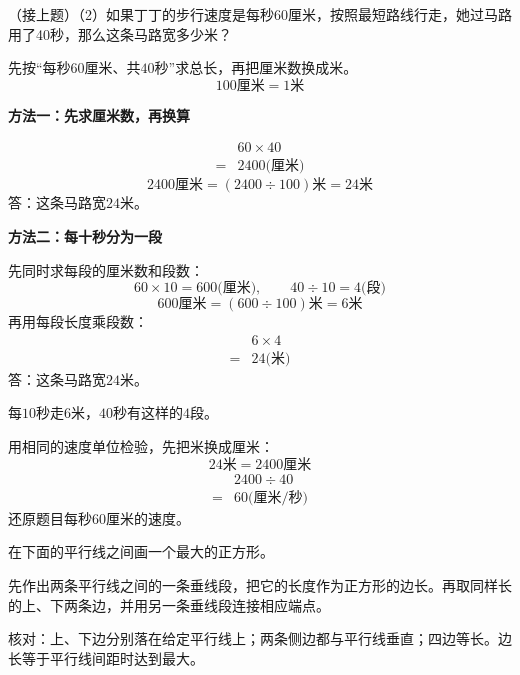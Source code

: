 （接上题）（2）如果丁丁的步行速度是每秒60厘米，按照最短路线行走，她过马路用了40秒，那么这条马路宽多少米？\par
\begin{BookAnswer}
先按“每秒\(60\)厘米、共\(40\)秒”求总长，再把厘米数换成米。\[100\text{厘米}=1\text{米}\]\par\noindent\begin{minipage}{\linewidth}\textbf{方法一：先求厘米数，再换算}\par \[\begin{aligned}&60\times40\\={}&2400\text{(厘米)}\end{aligned}\]\[2400\text{厘米}=(2400\div100)\text{米}=24\text{米}\]答：这条马路宽\(24\)米。\end{minipage}\par\noindent\begin{minipage}{\linewidth}\textbf{方法二：每十秒分为一段}\par 先同时求每段的厘米数和段数：\[60\times10=600\text{(厘米)},\qquad40\div10=4\text{(段)}\]\[600\text{厘米}=(600\div100)\text{米}=6\text{米}\]再用每段长度乘段数：\[\begin{aligned}&6\times4\\={}&24\text{(米)}\end{aligned}\]答：这条马路宽\(24\)米。\end{minipage}\par 每\(10\)秒走\(6\)米，\allowbreak{}\(40\)秒有这样的\(4\)段。\par 用相同的速度单位检验，先把米换成厘米：\[24\text{米}=2400\text{厘米}\]\[\begin{aligned}&2400\div40\\={}&60\text{(厘米/秒)}\end{aligned}\]还原题目每秒\(60\)厘米的速度。
\end{BookAnswer}

在下面的平行线之间画一个最大的正方形。\par
{}
\begin{BookAnswer}
先作出两条平行线之间的一条垂线段，把它的长度作为正方形的边长。再取同样长的上、下两条边，并用另一条垂线段连接相应端点。\par 核对：上、下边分别落在给定平行线上；两条侧边都与平行线垂直；四边等长。边长等于平行线间距时达到最大。
\end{BookAnswer}

